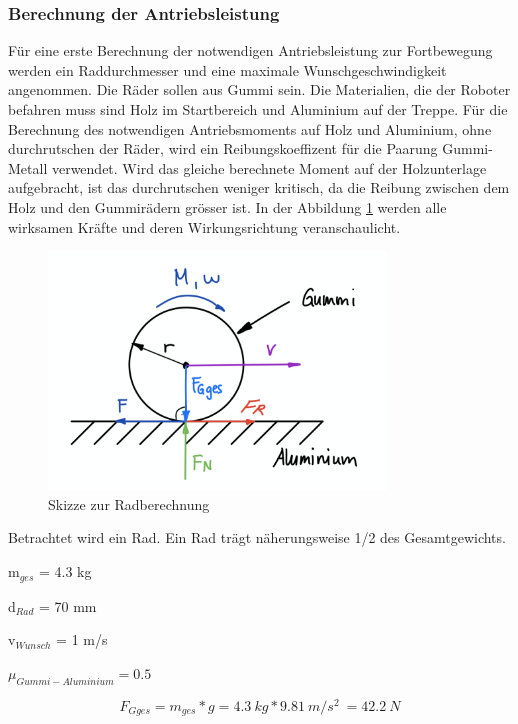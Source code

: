 \newpage

\subsubsection{Berechnung der Antriebsleistung}
Für eine erste Berechnung der notwendigen Antriebsleistung zur Fortbewegung werden ein Raddurchmesser und eine maximale Wunschgeschwindigkeit angenommen. Die Räder sollen aus Gummi sein. Die Materialien, die der Roboter befahren muss sind Holz im Startbereich und Aluminium auf der Treppe. Für die Berechnung des notwendigen Antriebsmoments auf Holz und Aluminium, ohne durchrutschen der Räder, wird ein Reibungskoeffizent \cite{Reibung} für die Paarung Gummi-Metall verwendet. Wird das gleiche berechnete Moment auf der Holzunterlage aufgebracht, ist das durchrutschen weniger kritisch, da die Reibung zwischen dem Holz und den Gummirädern grösser ist. In der Abbildung \ref{fig:skizze-radberechnung} werden alle wirksamen Kräfte und deren Wirkungsrichtung veranschaulicht.

\begin{figure}[H]
  \includegraphics[width=0.8\textwidth]{img/Fortbewegung/Radberechnung.png}
  \centering
  \caption{Skizze zur Radberechnung}
  \label{fig:skizze-radberechnung}
\end{figure}

\newpage

Betrachtet wird ein Rad. Ein Rad trägt näherungsweise 1/2 des Gesamtgewichts.

m$_{ges}$ = 4.3 kg

d$_{Rad}$ = 70 mm

v$_{Wunsch}$ = 1 m/s

\( \mu_{Gummi-Aluminium} = 0.5\)

\[F_{Gges} = m_{ges} * g = 4.3\ kg * 9.81\ m/s^2\ = 42.2\ N \]

